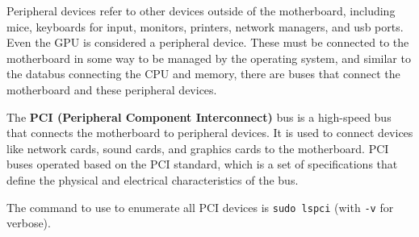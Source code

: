     Peripheral devices refer to other devices outside of the motherboard, including mice, keyboards for input, monitors, printers, network managers, and usb ports. Even the GPU is considered a peripheral device. These must be connected to the motherboard in some way to be managed by the operating system, and similar to the databus connecting the CPU and memory, there are buses that connect the motherboard and these peripheral devices. 

    \begin{definition}
      The \textbf{PCI (Peripheral Component Interconnect)} bus is a high-speed bus that connects the motherboard to peripheral devices. It is used to connect devices like network cards, sound cards, and graphics cards to the motherboard. PCI buses operated based on the PCI standard, which is a set of specifications that define the physical and electrical characteristics of the bus. 
    \end{definition}

    The command to use to enumerate all PCI devices is \texttt{sudo lspci} (with \texttt{-v} for verbose). 
    
